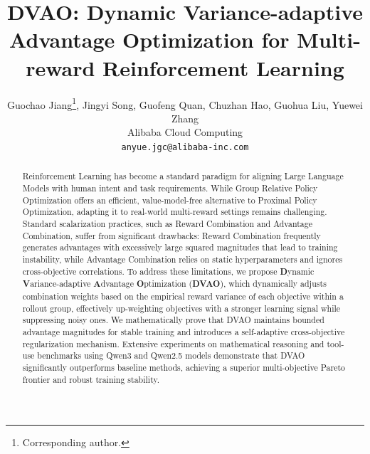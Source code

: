 \documentclass{article}
\title{DVAO: Dynamic Variance-adaptive Advantage Optimization for Multi-reward Reinforcement Learning}
\author{%
  Guochao Jiang\thanks{Corresponding author.}, Jingyi Song, Guofeng Quan, Chuzhan Hao, Guohua Liu, Yuewei Zhang \\
Alibaba Cloud Computing \\
\texttt{anyue.jgc@alibaba-inc.com}
}
\theoremstyle{plain}
\begin{document}
\maketitle


\begin{abstract}
  Reinforcement Learning has become a standard paradigm for aligning Large Language Models with human intent and task requirements. While Group Relative Policy Optimization offers an efficient, value-model-free alternative to Proximal Policy Optimization, adapting it to real-world multi-reward settings remains challenging. Standard scalarization practices, such as Reward Combination and Advantage Combination, suffer from significant drawbacks: Reward Combination frequently generates advantages with excessively large squared magnitudes that lead to training instability, while Advantage Combination relies on static hyperparameters and ignores cross-objective correlations. To address these limitations, we propose \textbf{D}ynamic \textbf{V}ariance-adaptive \textbf{A}dvantage \textbf{O}ptimization (\textbf{DVAO}), which dynamically adjusts combination weights based on the empirical reward variance of each objective within a rollout group, effectively up-weighting objectives with a stronger learning signal while suppressing noisy ones. We mathematically prove that DVAO maintains bounded advantage magnitudes for stable training and introduces a self-adaptive cross-objective regularization mechanism. Extensive experiments on mathematical reasoning and tool-use benchmarks using Qwen3 and Qwen2.5 models demonstrate that DVAO significantly outperforms baseline methods, achieving a superior multi-objective Pareto frontier and robust training stability.
\end{abstract}












\appendix



% 
\end{document}
